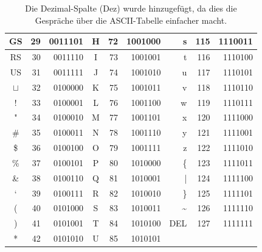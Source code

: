 \begin{table}[!htbp]
\begin{tabular}{|c|r|r||c|r|r||r|r|r|}
GS      & 29      	& 0011101          & H       & 72      	& 1001000          & s                & 115     	& 1110011         \\ \hline
RS      & 30     	& 0011110          & I       & 73      	& 1001001          & t                & 116     	& 1110100          \\ \hline
US      & 31      	& 0011111          & J       & 74      	& 1001010          & u                & 117     	& 1110101          \\ \hline
$\sqcup$ & 32 	& 0100000          & K       & 75      	& 1001011          & v                & 118     	& 1110110          \\ \hline
!       & 33      	& 0100001         & L       & 76      	& 1001100          & w                & 119     	& 1110111          \\ \hline
"       & 34      	& 0100010          & M       & 77      	& 1001101          & x                & 120     	& 1111000         \\ \hline
\#      & 35      	& 0100011          & N       & 78      	& 1001110          & y                & 121     	& 1111001          \\ \hline
\$      & 36      	& 0100100          & O       & 79      	& 1001111          & z                & 122     	& 1111010         \\ \hline
\%      & 37      	& 0100101          & P       & 80      	& 1010000          & \{               & 123     	& 1111011          \\ \hline
\&      & 38      	& 0100110          & Q       & 81      	& 1010001          & |                & 124     	& 1111100          \\ \hline
‘     & 39      	& 0100111          & R       & 82      	& 1010010          & \}               & 125     	& 1111101          \\ \hline
(       & 40      	& 0101000          & S       & 83      	& 1010011         & \textasciitilde  & 126  	& 1111110          \\ \hline
)       & 41      	& 0101001          & T       & 84      	& 1010100          & DEL                & 127     	& 1111111          \\ \hline
*       & 42      	& 0101010          & U       & 85      	& 1010101          &                  &         	&           \\ \hline
\end{tabular}
\caption{Die Dezimal-Spalte (Dez) wurde hinzugefügt, da dies die Gespräche über die \ac{ASCII}-Tabelle einfacher macht.}
\label{table-ascii}
\end{table}

